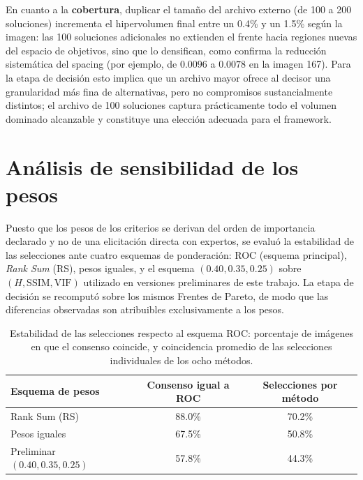 En cuanto a la \textbf{cobertura}, duplicar el tamaño del archivo externo (de 100 a 200 soluciones) incrementa el hipervolumen final entre un 0.4\% y un 1.5\% según la imagen: las 100 soluciones adicionales no extienden el frente hacia regiones nuevas del espacio de objetivos, sino que lo densifican, como confirma la reducción sistemática del spacing (por ejemplo, de $0.0096$ a $0.0078$ en la imagen 167). Para la etapa de decisión esto implica que un archivo mayor ofrece al decisor una granularidad más fina de alternativas, pero no compromisos sustancialmente distintos; el archivo de 100 soluciones captura prácticamente todo el volumen dominado alcanzable y constituye una elección adecuada para el framework.

\section{Análisis de sensibilidad de los pesos}
\label{sec:sensibilidad}

Puesto que los pesos de los criterios se derivan del orden de importancia declarado y no de una elicitación directa con expertos, se evaluó la estabilidad de las selecciones ante cuatro esquemas de ponderación: ROC (esquema principal), \textit{Rank Sum} (RS), pesos iguales, y el esquema $(0.40, 0.35, 0.25)$ sobre $(H, \text{SSIM}, \text{VIF})$ utilizado en versiones preliminares de este trabajo. La etapa de decisión se recomputó sobre los mismos Frentes de Pareto, de modo que las diferencias observadas son atribuibles exclusivamente a los pesos.

\begin{table}[H]
\centering
\caption[Sensibilidad de las selecciones a los pesos]{Estabilidad de las selecciones respecto al esquema ROC: porcentaje de imágenes en que el consenso coincide, y coincidencia promedio de las selecciones individuales de los ocho métodos.}
\label{tab:sensibilidad}
\begin{tabular}{lcc}
\hline
\textbf{Esquema de pesos} & \textbf{Consenso igual a ROC} & \textbf{Selecciones por método} \\
\hline
Rank Sum (RS) & 88.0\% & 70.2\% \\
Pesos iguales & 67.5\% & 50.8\% \\
Preliminar $(0.40, 0.35, 0.25)$ & 57.8\% & 44.3\% \\
\hline
\end{tabular}
\end{table}

